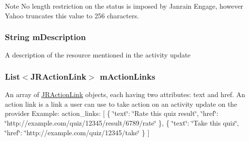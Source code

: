 \begin{DoxyNote}{Note}
No length restriction on the status is imposed by Janrain Engage, however Yahoo truncates this value to 256 characters. 
\end{DoxyNote}
\hypertarget{classcom_1_1janrain_1_1android_1_1engage_1_1types_1_1_j_r_activity_object_a6393a44879537429fc8269dda0086f20}{
\subsubsection[{mDescription}]{\setlength{\rightskip}{0pt plus 5cm}String {\bf mDescription}}}
\label{classcom_1_1janrain_1_1android_1_1engage_1_1types_1_1_j_r_activity_object_a6393a44879537429fc8269dda0086f20}
A description of the resource mentioned in the activity update \hypertarget{classcom_1_1janrain_1_1android_1_1engage_1_1types_1_1_j_r_activity_object_a9808cd0aa65b882929ba8be9a974b496}{
\subsubsection[{mActionLinks}]{\setlength{\rightskip}{0pt plus 5cm}List$<${\bf JRActionLink}$>$ {\bf mActionLinks}}}
\label{classcom_1_1janrain_1_1android_1_1engage_1_1types_1_1_j_r_activity_object_a9808cd0aa65b882929ba8be9a974b496}
An array of {\ttfamily \hyperlink{classcom_1_1janrain_1_1android_1_1engage_1_1types_1_1_j_r_action_link}{JRActionLink}} objects, each having two attributes: text and href. An action link is a link a user can use to take action on an activity update on the provider Example: {\ttfamily  action\_\-links: \mbox{[} \{ \char`\"{}text\char`\"{}: \char`\"{}Rate this quiz result\char`\"{}, \char`\"{}href\char`\"{}: \char`\"{}http://example.com/quiz/12345/result/6789/rate\char`\"{} \}, \{ \char`\"{}text\char`\"{}: \char`\"{}Take this quiz\char`\"{}, \char`\"{}href\char`\"{}: \char`\"{}http://example.com/quiz/12345/take\char`\"{} \} \mbox{]} }

